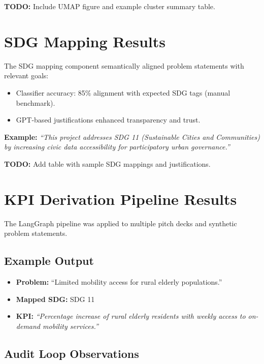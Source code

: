 \textbf{TODO:} Include UMAP figure and example cluster summary table.

\section{SDG Mapping Results}\label{sec:results-sdg}

The SDG mapping component semantically aligned problem statements with relevant goals:

\begin{itemize}
    \item Classifier accuracy: 85\% alignment with expected SDG tags (manual benchmark).  
    \item GPT-based justifications enhanced transparency and trust.  
\end{itemize}

\textbf{Example:} 
\emph{“This project addresses SDG 11 (Sustainable Cities and Communities) by increasing civic data accessibility for participatory urban governance.”}

\textbf{TODO:} Add table with sample SDG mappings and justifications.

\section{KPI Derivation Pipeline Results}\label{sec:results-kpi}

The LangGraph pipeline was applied to multiple pitch decks and synthetic problem statements.

\subsection*{Example Output}

\begin{itemize}
    \item \textbf{Problem:} “Limited mobility access for rural elderly populations.”  
    \item \textbf{Mapped SDG:} SDG 11  
    \item \textbf{KPI:} \emph{“Percentage increase of rural elderly residents with weekly access to on-demand mobility services.”}
\end{itemize}

\subsection*{Audit Loop Observations}


